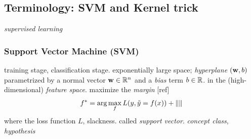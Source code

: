 \subsection{Terminology: SVM and Kernel trick}\label{sec:svm}
\emph{supervised learning} 

\subsubsection{Support Vector Machine (SVM)}
training stage, classification stage.
exponentially large space;
\emph{hyperplane} $(\vb{w},b)$ parametrized by a normal vector $\vb{w}\in\mathbb{R}^n$ and a \emph{bias} term $b\in\mathbb{R}$. in the (high-dimensional) \emph{feature space}.
maximize the \emph{margin} [ref]
\begin{equation}
	f^* = \arg \max_f  L(y,\tilde{y}=f(x)) + \norm{}
\end{equation}
where the loss function $L$, slackness. called \emph{support vector}.
\emph{concept class}, \emph{hypothesis}

